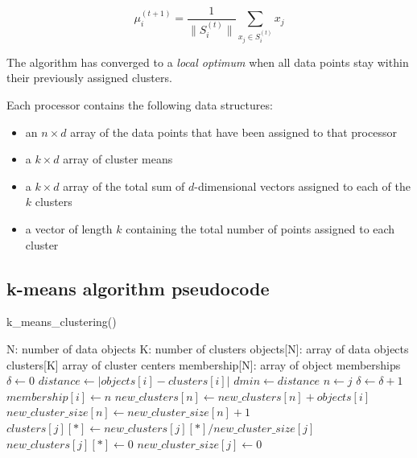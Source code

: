 \documentclass[parskip=true]{scrartcl}
\begin{document}
\begin{equation}
    \mu^{(t+1)}_i = \frac{1}{\|S^{(t)}_i\|} \sum_{x_j \in S^{(t)}_i} x_j
\end{equation}

The algorithm has converged to a \textit{local optimum} when all data points stay within their previously assigned clusters.

Each processor contains the following data structures:
\begin{itemize}
    \item an $n \times d$ array of the data points that have been assigned to that processor
    \item a $k \times d$ array of cluster means
    \item a $k \times d$ array of the total sum of $d$-dimensional vectors assigned to each of the $k$ clusters
    \item a vector of length $k$ containing the total number of points assigned to each cluster
\end{itemize}

\subsection{k-means algorithm pseudocode}

\begin{algorithm}[H]
\caption{k\_means\_clustering()}
\begin{algorithmic} 
\REQUIRE N: number of data objects
\REQUIRE K: number of clusters
\REQUIRE objects[N]: array of data objects
\REQUIRE clusters[K] array of cluster centers
\REQUIRE membership[N]: array of object memberships
\STATE $\delta \leftarrow 0$
\STATE $distance \leftarrow  | objects[i] - clusters[i] |$
\STATE $dmin \leftarrow distance$
\STATE $n \leftarrow j$
\ENDIF
\ENDFOR
{}
\STATE $\delta \leftarrow \delta + 1$
\STATE $membership[i] \leftarrow n$
\ENDIF
\STATE $new\_clusters[n] \leftarrow new\_clusters[n] + objects[i]$
\STATE $new\_cluster\_size[n] \leftarrow new\_cluster\_size[n] + 1$
\ENDFOR
{}
\STATE $clusters[j][*] \leftarrow new\_clusters[j][*] / new\_cluster\_size[j]$
\STATE $new\_clusters[j][*] \leftarrow 0$
\STATE $new\_cluster\_size[j] \leftarrow 0$
\ENDFOR
\ENDWHILE
\end{algorithmic}
\end{algorithm}
\end{document}
